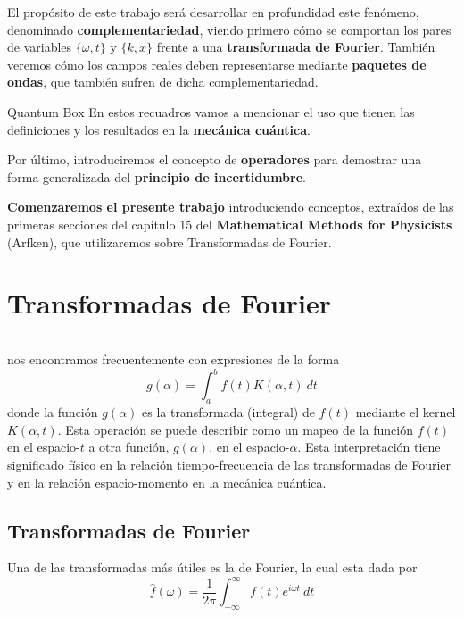 \vspace{0.5cm}

El propósito de este trabajo será desarrollar en profundidad este fenómeno, denominado \textbf{complementariedad}, viendo primero cómo se comportan los pares de variables $\{\omega, t\}$ y $\{k,x\}$ frente a una \textbf{transformada de Fourier}. También veremos cómo los campos reales deben representarse mediante \textbf{paquetes de ondas}, que también sufren de dicha complementariedad.
\begin{marginfigure}
\begin{qbox}{Quantum Box}
En estos recuadros vamos a mencionar el uso que tienen las definiciones y los resultados en la \textbf{mecánica cuántica}.
\end{qbox}   
\end{marginfigure}

Por último, introduciremos el concepto de \textbf{operadores} para demostrar una forma generalizada del \textbf{principio de incertidumbre}.



\newpage
\begin{intro}{}
\textbf{Comenzaremos el presente trabajo} introduciendo conceptos, extraídos de las primeras secciones del capítulo 15 del \textbf{Mathematical Methods for Physicists} (Arfken), que utilizaremos sobre Transformadas de Fourier.
\end{intro}


\section{Transformadas de Fourier}

\textcolor{myred}{\hrule}

 nos encontramos frecuentemente con expresiones de la forma 
\begin{equation}
   g(\alpha) = \int_a^b f(t) K(\alpha,t) ~dt
\end{equation}
donde la función $g(\alpha)$ es la transformada (integral) de $f(t)$ mediante el kernel $K(\alpha,t)$. Esta operación se puede describir como un mapeo de la función $f(t)$ en el espacio-$t$ a otra función, $g(\alpha)$, en el espacio-$\alpha$. Esta interpretación tiene significado físico en la relación tiempo-frecuencia de las transformadas de Fourier y en la relación espacio-momento en la mecánica cuántica. 

\subsection{\textbf{Transformadas de Fourier}}
Una de las transformadas más útiles es la de Fourier, la cual esta dada por 
\begin{equation}
    \hat{f}(\omega) = \frac{1}{2\pi} \int_{-\infty}^\infty  f(t) e^{i\omega t}~dt 
     \label{gomega}
\end{equation}

